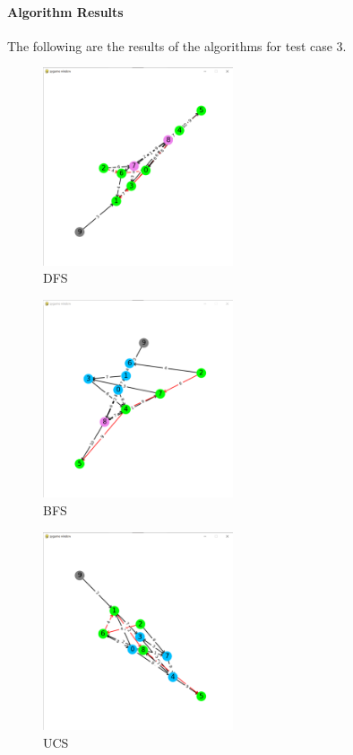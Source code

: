 \paragraph*{Algorithm Results}

\quad The following are the results of the algorithms for test case 3.

\begin{figure}[h!]
    \centering
    \includegraphics[width=0.5\textwidth]{result/testcase3/dfs.png}
    \caption{DFS}
\end{figure}
\begin{figure}[h!]
    \centering
    \includegraphics[width=0.5\textwidth]{result/testcase3/bfs.png}
    \caption{BFS}
\end{figure}
\begin{figure}[h!]
    \centering
    \includegraphics[width=0.5\textwidth]{result/testcase3/ucs.png}
    \caption{UCS}  
\end{figure}
